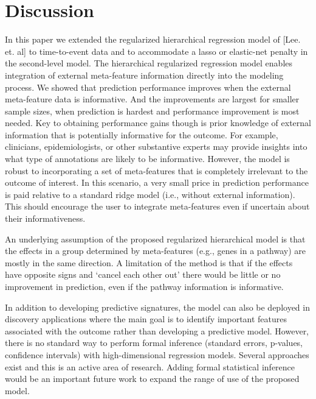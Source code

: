 \section{Discussion}
In this paper we extended the regularized hierarchical regression model of [Lee. et. al] to time-to-event data and to accommodate a lasso or elastic-net penalty in the second-level model. The hierarchical regularized regression model enables integration of external meta-feature information directly into the modeling process.  We showed that prediction performance improves when the external meta-feature data is informative. And the improvements are largest for smaller sample sizes, when prediction is hardest and performance improvement is most needed. Key to obtaining performance gains though is prior knowledge of external information that is potentially informative for the outcome. For example, clinicians, epidemiologists, or other substantive experts may provide insights into what type of annotations are likely to be informative.  However, the model is robust to incorporating a set of meta-features that is completely irrelevant to the outcome of interest.  In this scenario, a very small price in prediction performance is paid relative to a standard ridge model (i.e., without external information). This should encourage the user to integrate meta-features even if uncertain about their informativeness.

An underlying assumption of the proposed regularized hierarchical model is that the effects in a group determined by meta-features (e.g., genes in a pathway) are mostly in the same direction. A limitation of the method is that if the effects have opposite signs and ‘cancel each other out’ there would be little or no improvement in prediction, even if the pathway information is informative.

In addition to developing predictive signatures, the model can also be deployed in discovery applications where the main goal is to identify important features associated with the outcome rather than developing a predictive model. However, there is no standard way to perform formal inference (standard errors, p-values, confidence intervals) with high-dimensional regression models. Several approaches exist \citep{meinshausen2009p, shah2013variable} and this is an active area of research. Adding formal statistical inference would be an important future work to expand the range of use of the proposed model. 

